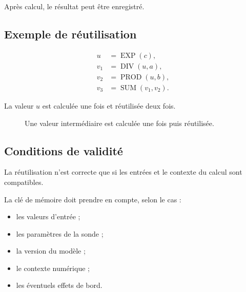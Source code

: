 \documentclass[11pt,a4paper]{article}
\begin{document}
Après calcul, le résultat peut être enregistré.

\subsection{Exemple de réutilisation}

\[
\begin{aligned}
u &= \operatorname{EXP}(c),\\
v_1 &= \operatorname{DIV}(u,a),\\
v_2 &= \operatorname{PROD}(u,b),\\
v_3 &= \operatorname{SUM}(v_1,v_2).
\end{aligned}
\]

La valeur $u$ est calculée une fois et réutilisée deux fois.

\begin{figure}[H]
\centering
{}
\caption{Une valeur intermédiaire est calculée une fois puis réutilisée.}
\end{figure}

\subsection{Conditions de validité}

La réutilisation n'est correcte que si les entrées et le contexte
du calcul sont compatibles.

La clé de mémoire doit prendre en compte, selon le cas :
\begin{itemize}
  \item les valeurs d'entrée ;
  \item les paramètres de la sonde ;
  \item la version du modèle ;
  \item le contexte numérique ;
  \item les éventuels effets de bord.
\end{itemize}
\end{document}
